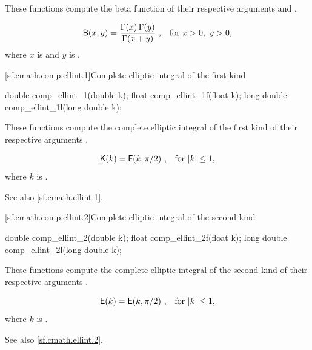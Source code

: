 \begin{itemdescr}
\pnum
\effects
These functions compute
the beta function
of their respective arguments
 and .

\pnum
\returns
\[ \mathsf{B}(x, y) = \frac{\Gamma(x) \, \Gamma(y)}{\Gamma(x + y)}
   \text{ ,\quad for $x > 0$,\, $y > 0$,} \]
where
$x$ is  and
$y$ is .
\end{itemdescr}

[sf.cmath.comp.ellint.1]{Complete elliptic integral of the first kind}%
%
%
%
%
%
\begin{itemdecl}
double       comp_ellint_1(double k);
float        comp_ellint_1f(float k);
long double  comp_ellint_1l(long double k);
\end{itemdecl}

\begin{itemdescr}
\pnum
\effects
These functions compute
the complete elliptic integral of the first kind
of their respective arguments
.

\pnum
\returns
\[ \mathsf{K}(k) = \mathsf{F}(k, \pi / 2) \text{ ,\quad for $|k| \le 1$,} \]
where
$k$ is .

\pnum
See also \ref{sf.cmath.ellint.1}.
\end{itemdescr}

[sf.cmath.comp.ellint.2]{Complete elliptic integral of the second kind}%
%
%
%
%
%
\begin{itemdecl}
double       comp_ellint_2(double k);
float        comp_ellint_2f(float k);
long double  comp_ellint_2l(long double k);
\end{itemdecl}

\begin{itemdescr}
\pnum
\effects
These functions compute
the complete elliptic integral of the second kind
of their respective arguments
.

\pnum
\returns
\[ \mathsf{E}(k) = \mathsf{E}(k, \pi / 2) \text{ ,\quad for $|k| \le 1$,} \]
where
$k$ is .

\pnum
See also \ref{sf.cmath.ellint.2}.
\end{itemdescr}

